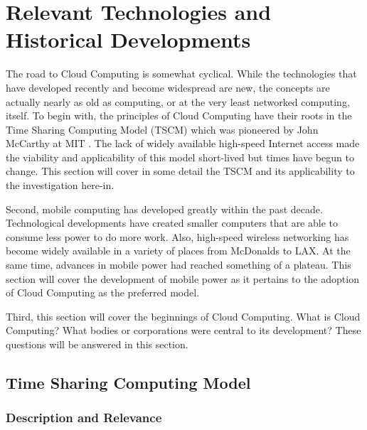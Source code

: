 \documentclass[12pt,oneside,letterpaper]{article}
\begin{document}
\section{Relevant Technologies and Historical Developments}

The road to Cloud Computing is somewhat cyclical.  While the technologies that
have developed recently and become widespread are new, the concepts are actually
nearly as old as computing, or at the very least networked computing, itself.
To begin with, the principles of Cloud Computing have their roots in the Time
Sharing Computing Model (TSCM) which was pioneered by John McCarthy at MIT
\citep{levy1994}.  The lack of widely available high-speed Internet access made the
viability and applicability of this model short-lived but times have begun to
change.  This section will cover in some detail the TSCM and its applicability
to the investigation here-in.

Second, mobile computing has developed greatly within the past decade.
Technological developments have created smaller computers that are able to
consume less power to do more work.  Also, high-speed wireless networking has
become widely available in a variety of places from McDonalds to LAX.  At the
same time, advances in mobile power had reached something of a plateau.  This
section will cover the development of mobile power as it pertains to the
adoption of Cloud Computing as the preferred model.

Third, this section will cover the beginnings of Cloud Computing.  What is Cloud
Computing?  What bodies or corporations were central to its development?  These
questions will be answered in this section.

\subsection{Time Sharing Computing Model}

\subsubsection{Description and Relevance}
\end{document}
